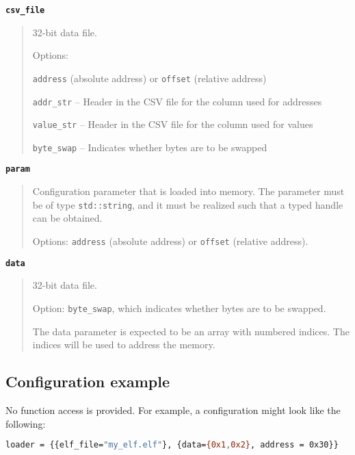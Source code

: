{\textbf {\footnotesize{\lstinline!csv_file!}}}
\vspace{-2pt}
\begin{quote}
32-bit data file.

Options:
\begin{itemize1}
\item {\small{\lstinline!address!}} (absolute address) or {\small{\lstinline!offset!}} (relative address)
\item {\small{\lstinline!addr_str!}}  -- Header in the CSV file for the column used for addresses
\item {\small{\lstinline!value_str!}} -- Header in the CSV file for the column used for values
\item {\small{\lstinline!byte_swap!}} -- Indicates whether bytes are to be swapped
\end{itemize1}
\end{quote}


{\textbf {\footnotesize{\lstinline!param!}}}
\vspace{-2pt}
\begin{quote}
Configuration parameter that is loaded into memory. The parameter must be of type {\small{\lstinline!std::string!}}, and it must be realized such that a typed handle can be obtained.

Options: {\small{\lstinline!address!}} (absolute address) or {\small{\lstinline!offset!}} (relative address).
\end{quote}


{\textbf {\footnotesize{\lstinline!data!}}}
\vspace{-2pt}
\begin{quote}
32-bit data file.

Option: {\small{\lstinline!byte_swap!}}, which indicates whether bytes are to be swapped.

The data parameter is expected to be an array with numbered indices. The indices will be used to address the memory.
\end{quote}


\subsection{Configuration example}

No function access is provided. For example, a configuration might look like the following:

\small
\begin{lstlisting}[language=bash]
    loader = {{elf_file="my_elf.elf"}, {data={0x1,0x2}, address = 0x30}}
\end{lstlisting}
\normalsize



